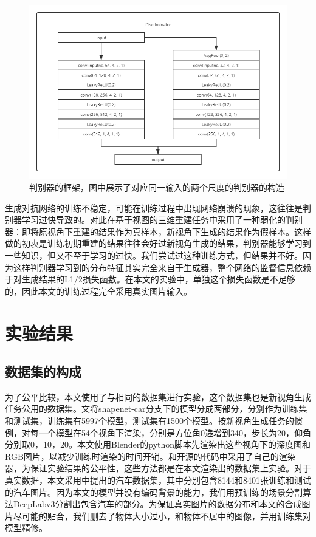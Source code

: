 \documentclass[UTF8,openany,AutoFakeBold,AutoFakeSlant,cs4size]{ctexbook}
\begin{document}
\begin{figure}
\centering
\includegraphics[width=15cm]{./images/discriminator.png}
\caption{判别器的框架，图中展示了对应同一输入的两个尺度的判别器的构造}
\label{fig:sample}
\end{figure}

生成对抗网络的训练不稳定，可能在训练过程中出现网络崩溃的现象，这往往是判别器学习过快导致的。对此\cite{kato2019vpl}在基于视图的三维重建任务中采用了一种弱化的判别器：即将原视角下重建的结果作为真样本，新视角下生成的结果作为假样本。这样做的初衷是训练初期重建的结果往往会好过新视角生成的结果，判别器能够学习到一些知识，但又不至于学习的过快。我们尝试过这种训练方式，但结果并不好。因为这样判别器学习到的分布特征其实完全来自于生成器，整个网络的监督信息依赖于对生成结果的L1/2损失函数。在本文的实验中，单独这个损失函数是不足够的，因此本文的训练过程完全采用真实图片输入。

\section{实验结果}

\subsection{数据集的构成}

为了公平比较，本文使用了与\cite{Zhou2016ViewSB}相同的数据集进行实验，这个数据集也是新视角生成任务公用的数据集。\cite{Zhou2016ViewSB}文将shapenet-car分支下的模型分成两部分，分别作为训练集和测试集，训练集有5997个模型，测试集有1500个模型。按新视角生成任务的惯例，对每一个模型在54个视角下渲染，分别是方位角0递增到340，步长为20，仰角分别取0，10，20。本文使用Blender的python脚本先渲染出这些视角下的深度图和RGB图片，以减少训练时渲染的时间开销。\cite{Zhou2016ViewSB}和\cite{TDB16a}开源的代码中采用了自己的渲染器，为保证实验结果的公平性，这些方法都是在本文渲染出的数据集上实验。对于真实数据，本文采用\cite{6755945}中提出的汽车数据集，其中分别包含8144和8401张训练和测试的汽车图片。因为本文的模型并没有编码背景的能力，我们用预训练的场景分割算法DeepLabv3\cite{Chen2017RethinkingAC}分割出包含汽车的部分。为保证真实图片的数据分布和本文的合成图片尽可能的贴合，我们删去了物体大小过小，和物体不居中的图像，并用训练集对模型精修。
\end{document}
